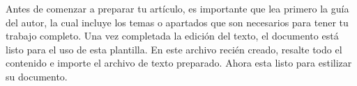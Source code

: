     
    
    
    
    Antes de comenzar a preparar tu artículo, es importante que lea primero la guía del autor, la cual incluye los temas o apartados que son necesarios para tener tu trabajo completo.
    Una vez completada la edición del texto, el documento está listo para el uso de esta plantilla. En este archivo recién creado, resalte todo el contenido e importe el archivo de texto preparado. Ahora esta listo para estilizar su documento.
    
    
    
